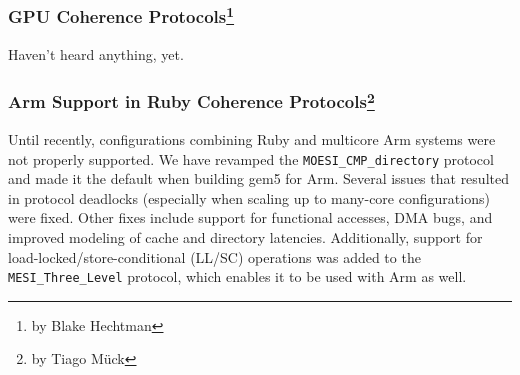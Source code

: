 \subsubsection[GPU Coherence Protocols]{GPU Coherence Protocols\footnote{by Blake Hechtman}}

Haven't heard anything, yet.

\subsubsection[Arm Support and Extensions]{Arm Support in Ruby Coherence Protocols\footnote{by Tiago M{\"u}ck}}

Until recently, configurations combining Ruby and multicore Arm systems were not properly supported.
We have revamped the \verb|MOESI_CMP_directory| protocol and made it the default when building gem5 for Arm.
Several issues that resulted in protocol deadlocks (especially when scaling up to many-core configurations) were fixed.
Other fixes include support for functional accesses, DMA bugs, and improved modeling of cache and directory latencies.
Additionally, support for load-locked/store-conditional (LL/SC) operations was added to the \verb|MESI_Three_Level| protocol, which enables it to be used with Arm as well.
